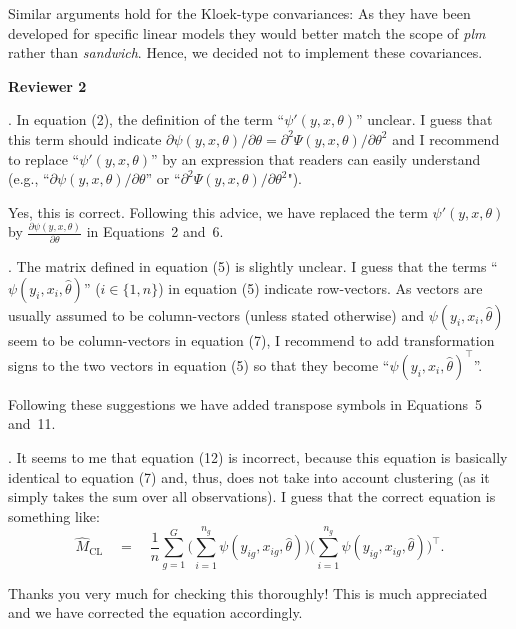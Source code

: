 \documentclass[american,foldmarks=false]{uibklttr}
\let\pkg=\emph
\newenvironment{review}{\fontshape{\itdefault}\fontseries{\bfdefault} \selectfont \smallskip}{\par}
\begin{document}
Similar arguments hold for the Kloek-type convariances: As they have been
developed for specific linear models they would better match the scope of
\pkg{plm} rather than \pkg{sandwich}. Hence, we decided not to implement these
covariances.


\newpage


\textbf{\LARGE Reviewer 2}

\begin{review}
1. In equation (2), the definition of the term ``$\psi'(y, x,
\theta)$'' unclear. I guess that this term should indicate $\partial \psi(y, x,
\theta)/\partial\theta = \partial^2\Psi(y, x, \theta)/\partial\theta^2$ and I
recommend to replace ``$\psi'(y, x, \theta)$'' by an expression that readers can
easily understand (e.g., ``$\partial \psi(y, x, \theta)/\partial\theta$'' or
``$\partial^2\Psi(y, x, \theta)/\partial\theta^2$").
\end{review}

Yes, this is correct. Following this advice, we have replaced the
term $\psi'(y, x, \theta)$ by $\frac{\partial \psi(y, x,\theta)}{\partial\theta}$
in Equations~2 and~6.


\begin{review}
2. The matrix defined in equation (5) is slightly unclear. I
guess that the terms ``$\psi(y_i, x_i, \hat\theta)$'' ($i \in \{1, n\}$) in
equation (5) indicate row-vectors. As vectors are usually assumed to be
column-vectors (unless stated otherwise) and $\psi(y_i, x_i, \hat\theta)$ seem
to be column-vectors in equation (7), I recommend to add transformation signs to
the two vectors in equation (5) so that they become ``$\psi(y_i, x_i,
\hat\theta)^\top$''.
\end{review}

Following these suggestions we have added transpose symbols in Equations~5
and~11. 


\begin{review}
3. It seems to me that equation (12) is incorrect, because this
equation is basically identical to equation (7) and, thus, does not take into
account clustering (as it simply takes the sum over all observations). I guess
that the correct equation is something like:
\[
\hat M_\mathrm{CL} \quad = \quad \frac{1}{n} \sum_{g = 1}^G\bigg(\sum_{i = 1}^{n_{g}}\psi(y_{ig}, x_{ig}, \hat \theta) \bigg)
  \bigg(\sum_{i = 1}^{n_{g}} \psi(y_{ig}, x_{ig}, \hat \theta) \bigg)^\top.
\]
\end{review}

Thanks you very much for checking this thoroughly! This is much appreciated
and we have corrected the equation accordingly.
\end{document}
